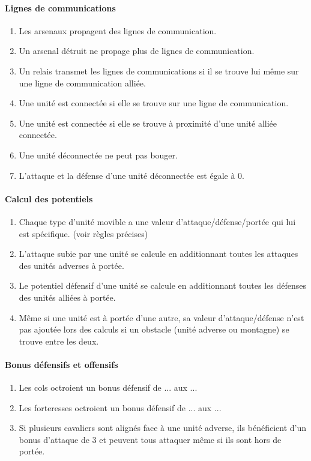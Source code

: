 		\paragraph{Lignes de communications}
		\begin{enumerate}
		\item Les arsenaux propagent des lignes de communication.
		\item Un arsenal détruit ne propage plus de lignes de communication.
		\item Un relais transmet les lignes de communications si il se trouve lui même sur une ligne de communication alliée.
		\item Une unité est connectée si elle se trouve sur une ligne de communication.
		\item Une unité est connectée si elle se trouve à proximité d'une unité alliée connectée.
		\item Une unité déconnectée ne peut pas bouger.
		\item L'attaque et la défense d'une unité déconnectée est égale à 0.
		\end{enumerate}
		
		\paragraph{Calcul des potentiels}
		\begin{enumerate}
		\item Chaque type d'unité movible a une valeur d'attaque/défense/portée qui lui est spécifique. (voir règles précises)
		\item L'attaque subie par une unité se calcule en additionnant toutes les attaques des unités adverses à portée.
		\item Le potentiel défensif d'une unité se calcule en additionnant toutes les défenses des unités alliées à portée.
		\item Même si une unité est à portée d'une autre, sa valeur d'attaque/défense n'est pas ajoutée lors des calculs si un obstacle (unité adverse ou montagne) se trouve entre les deux.
		\end{enumerate}
		
		\paragraph{Bonus défensifs et offensifs}
		\begin{enumerate}
		\item Les cols octroient un bonus défensif de ... aux ...
		\item Les forteresses octroient un bonus défensif de ... aux ...
		\item Si plusieurs cavaliers sont alignés face à une unité adverse, ils bénéficient d'un bonus d'attaque de 3 et peuvent tous attaquer même si ils sont hors de portée.
		\end{enumerate}
		
